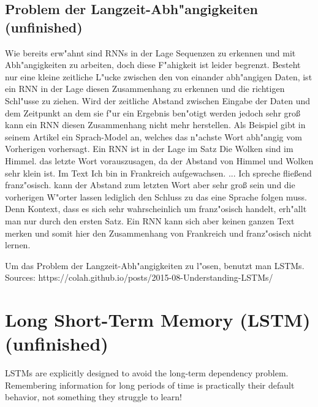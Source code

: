 {\subsection{Problem der Langzeit-Abh"angigkeiten (unfinished)}
Wie bereits erw"ahnt sind RNNs in der Lage Sequenzen zu erkennen und mit Abh"angigkeiten zu arbeiten, doch diese F"ahigkeit ist leider begrenzt. Besteht nur eine kleine zeitliche L"ucke zwischen den von einander abh"angigen Daten, ist ein RNN in der Lage diesen Zusammenhang zu erkennen und die richtigen Schl"usse zu ziehen. Wird der zeitliche Abstand zwischen Eingabe der Daten und dem Zeitpunkt an dem sie f"ur ein Ergebnis ben"otigt werden jedoch sehr gro{\ss} kann ein RNN diesen Zusammenhang nicht mehr herstellen. Als Beispiel gibt \cite{Olah} in seinem Artikel ein Sprach-Model an, welches das n"achste Wort abh"angig vom Vorherigen vorhersagt. Ein RNN ist in der Lage im Satz {\glqq}Die Wolken sind im Himmel.{\grqq} das letzte Wort vorauszusagen, da der Abstand von Himmel und Wolken sehr klein ist. Im Text {\glqq}Ich bin in Frankreich aufgewachsen. ... Ich spreche flie{\ss}end franz"osisch.{\grqq} kann der Abstand zum letzten Wort aber sehr gro{\ss} sein und die vorherigen W"orter lassen lediglich den Schluss zu das eine Sprache folgen muss. Denn Kontext, dass es sich sehr wahrscheinlich um franz"osisch handelt, erh"allt man nur durch den ersten Satz. Ein RNN kann sich aber keinen ganzen Text merken und somit hier den Zusammenhang von Frankreich und franz"osisch nicht lernen.

Um das Problem der Langzeit-Abh"angigkeiten zu l"osen, benutzt man LSTMs.\\
Sources: https://colah.github.io/posts/2015-08-Understanding-LSTMs/


\section{Long Short-Term Memory (LSTM) (unfinished)}
LSTMs are explicitly designed to avoid the long-term dependency problem. Remembering information for long periods of time is practically their default behavior, not something they struggle to learn!

}
